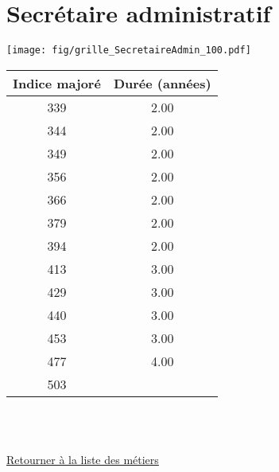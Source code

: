\newpage 
 
\chapter{Secrétaire administratif} 

\begin{minipage}{0.55\linewidth}\texttt{[image: fig/grille\_SecretaireAdmin\_100.pdf]}\end{minipage} 
\begin{minipage}{0.3\linewidth} 
 \begin{center} 

\begin{tabular}[htb]{|c|c|} 
\hline 
 Indice majoré &  Durée (années) \\ 
\hline \hline 
 339 &  2.00 \\ 
\hline 
 344 &  2.00 \\ 
\hline 
 349 &  2.00 \\ 
\hline 
 356 &  2.00 \\ 
\hline 
 366 &  2.00 \\ 
\hline 
 379 &  2.00 \\ 
\hline 
 394 &  2.00 \\ 
\hline 
 413 &  3.00 \\ 
\hline 
 429 &  3.00 \\ 
\hline 
 440 &  3.00 \\ 
\hline 
 453 &  3.00 \\ 
\hline 
 477 &  4.00 \\ 
\hline 
 503 &   \\ 
\hline 
\hline 
\end{tabular} 
\end{center} 
 \end{minipage} 

~\\ 
 


   
 \localtableofcontents 

~\\ 
 
 \hyperlink{page.2}{\noindent Retourner à la liste des métiers}

